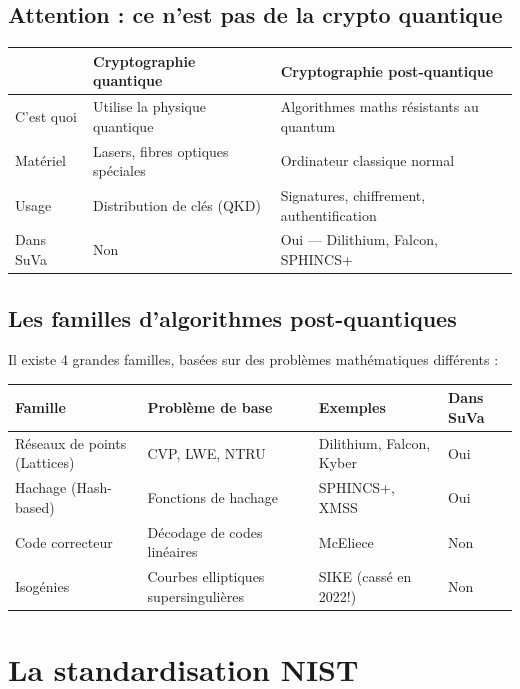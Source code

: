 \documentclass[12pt, a4paper]{article}
\begin{document}
\subsection{Attention : ce n'est pas de la crypto quantique}

\begin{center}
\renewcommand{\arraystretch}{1.4}
\begin{tabular}{lll}
  \toprule
  & \textbf{Cryptographie quantique} & \textbf{Cryptographie post-quantique} \\
  \midrule
  C'est quoi & Utilise la physique quantique & Algorithmes maths résistants au quantum \\
  Matériel & Lasers, fibres optiques spéciales & Ordinateur classique normal \\
  Usage & Distribution de clés (QKD) & Signatures, chiffrement, authentification \\
  Dans SuVa & Non & Oui --- Dilithium, Falcon, SPHINCS+ \\
  \bottomrule
\end{tabular}
\end{center}

\subsection{Les familles d'algorithmes post-quantiques}

Il existe 4 grandes familles, basées sur des problèmes mathématiques différents :

\begin{center}
\renewcommand{\arraystretch}{1.5}
\begin{tabular}{llll}
  \toprule
  \textbf{Famille} & \textbf{Problème de base} & \textbf{Exemples} & \textbf{Dans SuVa} \\
  \midrule
  Réseaux de points (Lattices) & CVP, LWE, NTRU & Dilithium, Falcon, Kyber & Oui \\
  Hachage (Hash-based) & Fonctions de hachage & SPHINCS+, XMSS & Oui \\
  Code correcteur & Décodage de codes linéaires & McEliece & Non \\
  Isogénies & Courbes elliptiques supersingulières & SIKE (cassé en 2022!) & Non \\
  \bottomrule
\end{tabular}
\end{center}

\section{La standardisation NIST}
\end{document}
